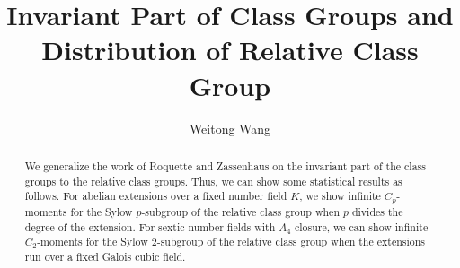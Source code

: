 \documentclass{amsart}
\numberwithin{equation}{section}
\theoremstyle{plain}
\theoremstyle{definition}
\theoremstyle{remark}
\begin{document}
	\title[Invariant Part of Class Groups and Distribution of Relative Class Group]{Invariant Part of Class Groups and Distribution of Relative Class Group}
	\date{}
	\author{Weitong Wang}
	\address{College of Mathematical Sciences, Shaw Hall of Harbin Engineering University, No. 145, Nantong Street, Nangang District, Harbin, Heilongjiang Province, 150001 China}
	\begin{abstract}
		We generalize the work of Roquette and Zassenhaus on the invariant part of the class groups to the relative class groups.
		Thus, we can show some statistical results as follows.
		For abelian extensions over a fixed number field $K$, we show infinite $C_p$-moments for the Sylow $p$-subgroup of the relative class group when $p$ divides the degree of the extension.
		For sextic number fields with $A_4$-closure, we can show infinite $C_2$-moments for the Sylow $2$-subgroup of the relative class group when the extensions run over a fixed Galois cubic field.
	\end{abstract}
	\maketitle
	\tableofcontents
\end{document}
